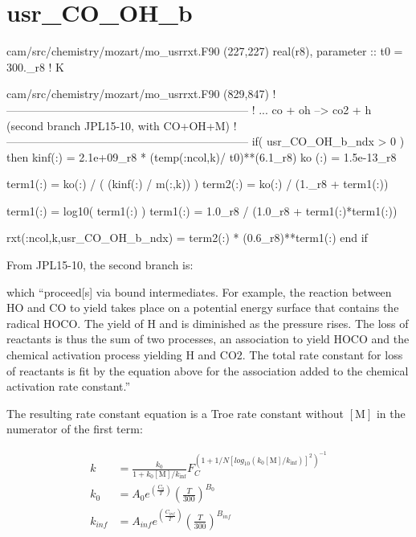\documentclass[titlepage]{article}
\begin{document}
\section{usr\_CO\_OH\_b}

\begin{blockcode}[commandchars=\\\{\}]
\color{gray}cam/src/chemistry/mozart/mo_usrrxt.F90 (227,227)
  real(r8), parameter :: t0     = 300._r8                ! K
\end{blockcode}
\begin{blockcode}[commandchars=\\\{\}]
\color{gray}cam/src/chemistry/mozart/mo_usrrxt.F90 (829,847)
!-----------------------------------------------------------------
!   ... co + oh --> co2 + h (second branch JPL15-10, with CO+OH+M)
!-----------------------------------------------------------------
       if( usr_CO_OH_b_ndx > 0 ) then
         kinf(:)  = 2.1e+09_r8 * (temp(:ncol,k)/ t0)**(6.1_r8)
         ko  (:)  = 1.5e-13_r8

         term1(:) = ko(:) / ( (kinf(:) / m(:,k)) )
         term2(:) = ko(:) / (1._r8 + term1(:))

         term1(:) = log10( term1(:) )
         term1(:) = 1.0_r8 / (1.0_r8 + term1(:)*term1(:))

         rxt(:ncol,k,usr_CO_OH_b_ndx) = term2(:) * (0.6_r8)**term1(:)
       end if
\end{blockcode}

From JPL15-10, the second branch is:
\vspace{20px}


\vspace{20px}
\noindent which ``proceed[s] via bound intermediates. For example, the reaction between HO and CO to yield  takes place on a potential energy surface that contains the radical HOCO. The yield of H and  is diminished as the pressure rises. The loss of reactants is thus the sum of two processes, an association to yield HOCO and the chemical activation process yielding H and CO2. The total rate constant for loss of reactants is fit by the equation above for the association added to the chemical activation rate constant.''

The resulting rate constant equation is a Troe rate constant without $[\mbox{M}]$ in the numerator of the first term:

\begin{equation}
\begin{split}
k & = \frac{k_0}{1+k_0[\mbox{M}]/k_{\inf}}F_C^{(1+1/N[log_{10}(k_0[\mbox{M}]/k_{\inf})]^2)^{-1}} \\
k_0 & = A_0 e^{\left( \frac{C_0}{T} \right)} \left( \frac{T}{300} \right)^{B_0} \\
k_{inf} & = A_{inf} e^{\left( \frac{C_{inf}}{T} \right)} \left( \frac{T}{300} \right)^{B_{inf}}
\end{split}
\end{equation}
\end{document}
